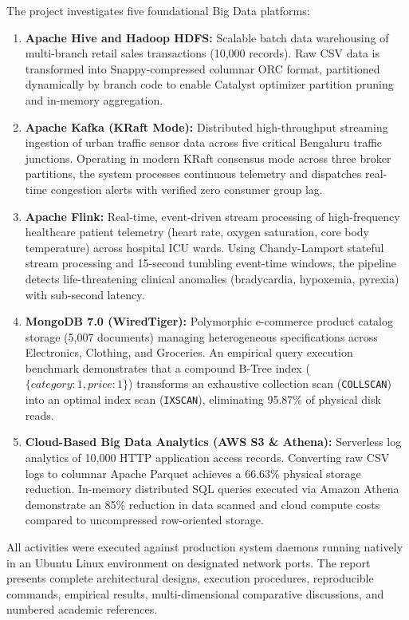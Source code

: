 \documentclass[12pt,a4paper]{report}
\begin{document}
The project investigates five foundational Big Data platforms:
\begin{enumerate}
    \item \textbf{Apache Hive and Hadoop HDFS:} Scalable batch data warehousing of multi-branch retail sales transactions (10,000 records). Raw CSV data is transformed into Snappy-compressed columnar ORC format, partitioned dynamically by branch code to enable Catalyst optimizer partition pruning and in-memory aggregation.
    \item \textbf{Apache Kafka (KRaft Mode):} Distributed high-throughput streaming ingestion of urban traffic sensor data across five critical Bengaluru traffic junctions. Operating in modern KRaft consensus mode across three broker partitions, the system processes continuous telemetry and dispatches real-time congestion alerts with verified zero consumer group lag.
    \item \textbf{Apache Flink:} Real-time, event-driven stream processing of high-frequency healthcare patient telemetry (heart rate, oxygen saturation, core body temperature) across hospital ICU wards. Using Chandy-Lamport stateful stream processing and 15-second tumbling event-time windows, the pipeline detects life-threatening clinical anomalies (bradycardia, hypoxemia, pyrexia) with sub-second latency.
    \item \textbf{MongoDB 7.0 (WiredTiger):} Polymorphic e-commerce product catalog storage (5,007 documents) managing heterogeneous specifications across Electronics, Clothing, and Groceries. An empirical query execution benchmark demonstrates that a compound B-Tree index ($\{category: 1, price: 1\}$) transforms an exhaustive collection scan (\texttt{COLLSCAN}) into an optimal index scan (\texttt{IXSCAN}), eliminating 95.87\% of physical disk reads.
    \item \textbf{Cloud-Based Big Data Analytics (AWS S3 \& Athena):} Serverless log analytics of 10,000 HTTP application access records. Converting raw CSV logs to columnar Apache Parquet achieves a 66.63\% physical storage reduction. In-memory distributed SQL queries executed via Amazon Athena demonstrate an 85\% reduction in data scanned and cloud compute costs compared to uncompressed row-oriented storage.
\end{enumerate}

All activities were executed against production system daemons running natively in an Ubuntu Linux environment on designated network ports. The report presents complete architectural designs, execution procedures, reproducible commands, empirical results, multi-dimensional comparative discussions, and numbered academic references.
\end{document}
